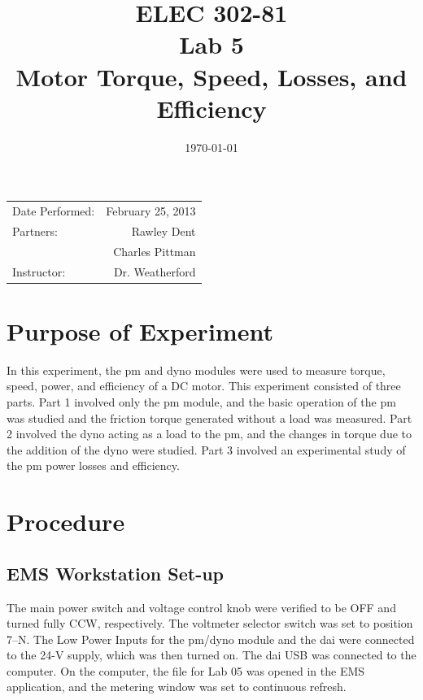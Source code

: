 \documentclass{article}
\author{}
\title{ELEC 302-81\\ Lab 5\\ Motor Torque, Speed, Losses, and Efficiency}
\date{\today}
\begin{document}
\maketitle

\begin{center}
  \begin{tabular}{lr}
    Date Performed: & February 25, 2013 \\
    Partners: & Rawley Dent \\
              & Charles Pittman \\
    Instructor: & Dr. Weatherford
  \end{tabular}
\end{center}

\pagebreak


\section{Purpose of Experiment}

In this experiment, the \gls{pm} and \gls{dyno} modules were used to measure
torque, speed, power, and efficiency of a DC motor. This experiment consisted
of three parts. Part 1 involved only the \gls{pm} module, and the basic
operation of the \gls{pm} was studied and the friction torque generated without
a load was measured. Part 2 involved the \gls{dyno} acting as a load to the
\gls{pm}, and the changes in torque due to the addition of the \gls{dyno} were
studied. Part 3 involved an experimental study of the \gls{pm} power losses and
efficiency.

\section{Procedure}

\subsection{EMS Workstation Set-up}

The main power switch and voltage control knob were verified to be OFF and
turned fully CCW, respectively. The voltmeter selector switch was set to
position 7--N. The Low Power Inputs for the \gls{pm}/\gls{dyno} module and the
\gls{dai} were connected to the 24-V supply, which was then turned on. The
\gls{dai} USB was connected to the computer. On the computer, the file for Lab
05 was opened in the EMS application, and the metering window was set to
continuous refresh.
\end{document}
